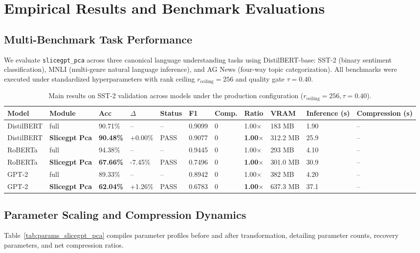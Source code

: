 \section{Empirical Results and Benchmark Evaluations}
\label{sec:results}

\subsection{Multi-Benchmark Task Performance}
We evaluate \texttt{slicegpt\_pca} across three canonical language understanding tasks using DistilBERT-base: SST-2 (binary sentiment classification), MNLI (multi-genre natural language inference), and AG News (four-way topic categorization). All benchmarks were executed under standardized hyperparameters with rank ceiling $r_{\mathrm{ceiling}} = 256$ and quality gate $\tau = 0.40$.

\begin{table}[t]
\centering
\small
\begin{tabular}{lllllllllll}
\toprule
\textbf{Model} & \textbf{Module} & \textbf{Acc} & \textbf{$\Delta$} & \textbf{Status} & \textbf{F1} & \textbf{Comp.} & \textbf{Ratio} & \textbf{VRAM} & \textbf{Inference (s)} & \textbf{Compression (s)} \\
\midrule
DistilBERT & full & 90.71\% & -- & -- & 0.9099 & 0 & 1.00$\times$ & 183 MB & 1.90 & -- \\
DistilBERT & \textbf{Slicegpt Pca} & \textbf{90.48\%} & +0.00\% & PASS & 0.9077 & 0 & \textbf{1.00$\times$} & 312.2 MB & 25.9 & -- \\
RoBERTa & full & 94.38\% & -- & -- & 0.9445 & 0 & 1.00$\times$ & 293 MB & 4.10 & -- \\
RoBERTa & \textbf{Slicegpt Pca} & \textbf{67.66\%} & -7.45\% & PASS & 0.7496 & 0 & \textbf{1.00$\times$} & 301.0 MB & 30.9 & -- \\
GPT-2 & full & 89.33\% & -- & -- & 0.8942 & 0 & 1.00$\times$ & 382 MB & 4.20 & -- \\
GPT-2 & \textbf{Slicegpt Pca} & \textbf{62.04\%} & +1.26\% & PASS & 0.6783 & 0 & \textbf{1.00$\times$} & 637.3 MB & 37.1 & -- \\
\bottomrule
\end{tabular}
\caption{Main results on SST-2 validation across models under the production configuration ($r_{\mathrm{ceiling}}=256, \tau=0.40$).}
\label{tab:main_sst2}
\end{table}

\subsection{Parameter Scaling and Compression Dynamics}
Table~\ref{tab:params_slicegpt_pca} compiles parameter profiles before and after transformation, detailing parameter counts, recovery parameters, and net compression ratios.

